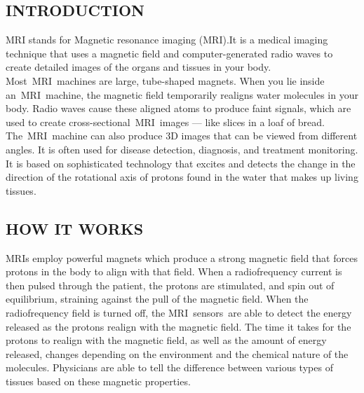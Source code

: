 \documentclass[12pt]{article}
\begin{document}
\subsection{INTRODUCTION}
MRI stands for Magnetic resonance imaging (MRI).It is a medical imaging technique that uses a magnetic field and computer-generated radio waves to create detailed images of the organs and tissues in your body.
Most MRI machines are large, tube-shaped magnets. When you lie inside an MRI machine, the magnetic field temporarily realigns water molecules in your body. Radio waves cause these aligned atoms to produce faint signals, which are used to create cross-sectional MRI images — like slices in a loaf of bread.
The MRI machine can also produce 3D images that can be viewed from different angles. It is often used for disease detection, diagnosis, and treatment monitoring. It is based on sophisticated technology that excites and detects the change in the direction of the rotational axis of protons found in the water that makes up living tissues.

\subsection{HOW IT WORKS}
MRIs employ powerful magnets which produce a strong magnetic field that forces protons in the body to align with that field. When a radiofrequency current is then pulsed through the patient, the protons are stimulated, and spin out of equilibrium, straining against the pull of the magnetic field. When the radiofrequency field is turned off, the MRI sensors are able to detect the energy released as the protons realign with the magnetic field. The time it takes for the protons to realign with the magnetic field, as well as the amount of energy released, changes depending on the environment and the chemical nature of the molecules. Physicians are able to tell the difference between various types of tissues based on these magnetic properties.
\end{document}
